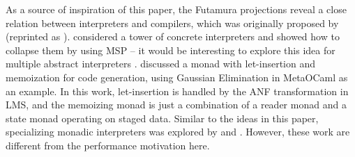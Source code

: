 As a source of inspiration of this paper, the Futamura projections reveal a
close relation between interpreters and compilers, which was
originally proposed by \citet{futamura1971partial} (reprinted as \cite{Futamura1999}).
\citet{Amin:2017:CTI:3177123.3158140} considered a tower of concrete
interpreters and showed how to collapse them by using MSP -- it would be interesting
to explore this idea for multiple abstract interpreters
\cite{Cousot:2019:AAI:3302515.3290355, Giacobazzi:2015:APA:2676726.2676987}.
\citet{10.1007/11561347_18} discussed a monad with let-insertion and
memoization for code generation, using Gaussian Elimination in MetaOCaml as an
example. In this work, let-insertion is handled by the ANF transformation in
LMS, and the memoizing monad is just a combination of a reader monad and a state monad
operating on staged data.  Similar to the ideas in this paper, specializing
monadic interpreters was explored by \citet{danvy1991compiling} and
\citet{DBLP:conf/dsl/SheardBP99}. However, these work are different from the performance
motivation here. 
